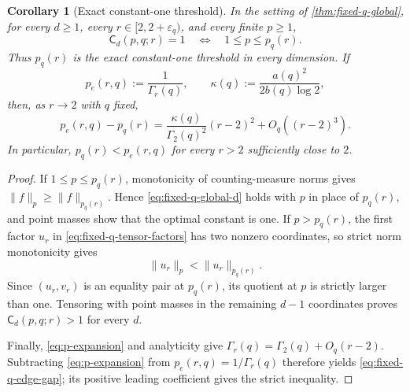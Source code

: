 \documentclass[11pt,reqno]{amsart}
\numberwithin{equation}{section}
\newtheorem{corollary}[corollary]{Corollary}
\theoremstyle{definition}
\theoremstyle{remark}
\newcommand{\Cpqr}{\mathsf C}
\begin{document}
\begin{corollary}[Exact constant-one threshold]
\label{cor:fixed-q-threshold}
In the setting of \cref{thm:fixed-q-global}, for every $d\ge1$, every
$r\in[2,2+\varepsilon_q)$, and every finite $p\ge1$,
\begin{equation}\label{eq:fixed-q-threshold}
  \Cpqr_d(p,q;r)=1
  \quad\Longleftrightarrow\quad
  1\le p\le p_q(r).
\end{equation}
Thus $p_q(r)$ is the exact constant-one threshold in every dimension.  If
\[
  p_e(r,q):=\frac1{\Gamma_r(q)},
  \qquad
  \kappa(q):=\frac{a(q)^2}{2b(q)\log2},
\]
then, as $r\to2$ with $q$ fixed,
\begin{equation}\label{eq:fixed-q-edge-gap}
  p_e(r,q)-p_q(r)
  =\frac{\kappa(q)}{\Gamma_2(q)^2}(r-2)^2
   +O_q((r-2)^3).
\end{equation}
In particular, $p_q(r)<p_e(r,q)$ for every $r>2$ sufficiently close to $2$.
\end{corollary}

\begin{proof}
If $1\le p\le p_q(r)$, monotonicity of counting-measure norms gives
$\|f\|_p\ge\|f\|_{p_q(r)}$.  Hence \eqref{eq:fixed-q-global-d} holds with
$p$ in place of $p_q(r)$, and point masses show that the optimal constant is
one.  If $p>p_q(r)$, the first factor $u_r$ in
\eqref{eq:fixed-q-tensor-factors} has two nonzero coordinates, so strict norm
monotonicity gives
\[
  \|u_r\|_p<\|u_r\|_{p_q(r)}.
\]
Since $(u_r,v_r)$ is an equality pair at $p_q(r)$, its quotient at $p$ is
strictly larger than one.  Tensoring with point masses in the remaining
$d-1$ coordinates proves $\Cpqr_d(p,q;r)>1$ for every $d$.

Finally, \eqref{eq:p-expansion} and analyticity give
$\Gamma_r(q)=\Gamma_2(q)+O_q(r-2)$.  Subtracting \eqref{eq:p-expansion} from
$p_e(r,q)=1/\Gamma_r(q)$ therefore yields \eqref{eq:fixed-q-edge-gap}; its
positive leading coefficient gives the strict inequality.
\end{proof}
\end{document}
